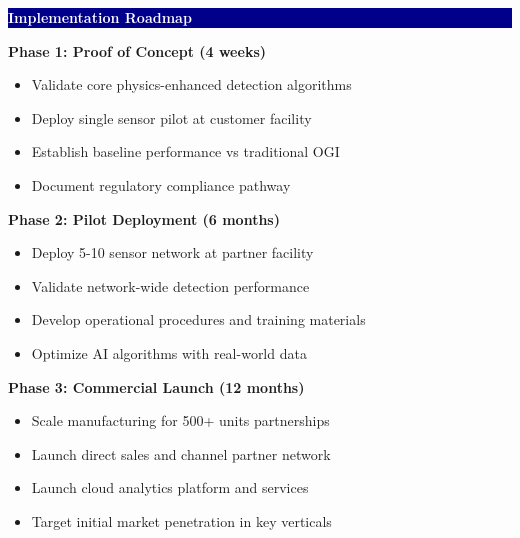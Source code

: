 \documentclass[11pt,a4paper]{article}
\begin{document}
\vspace{0.4cm}

\colorbox{darkblue}{\parbox{\textwidth}{\centering\textcolor{white}{\textbf{Implementation Roadmap}}}}

\textbf{Phase 1: Proof of Concept (4 weeks)}
\begin{itemize}[leftmargin=*,itemsep=0pt]
\item Validate core physics-enhanced detection algorithms
\item Deploy single sensor pilot at customer facility
\item Establish baseline performance vs traditional OGI
\item Document regulatory compliance pathway
\end{itemize}

\textbf{Phase 2: Pilot Deployment (6 months)}
\begin{itemize}[leftmargin=*,itemsep=0pt]
\item Deploy 5-10 sensor network at partner facility
\item Validate network-wide detection performance
\item Develop operational procedures and training materials
\item Optimize AI algorithms with real-world data
\end{itemize}

\textbf{Phase 3: Commercial Launch (12 months)}
\begin{itemize}[leftmargin=*,itemsep=0pt]
\item Scale manufacturing for 500+ units partnerships
\item Launch direct sales and channel partner network
\item Launch cloud analytics platform and services
\item Target initial market penetration in key verticals
\end{itemize}

\vspace{0.4cm}
\end{document}
